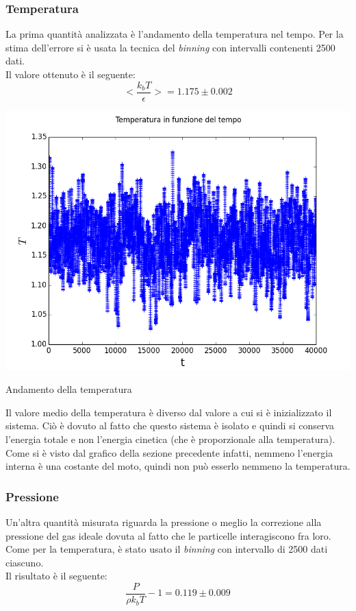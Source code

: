 \subsubsection{Temperatura}
La prima quantità analizzata è l'andamento della temperatura nel tempo. Per la stima dell'errore si è usata la tecnica del \emph{binning} con intervalli contenenti 2500 dati.\\
Il valore ottenuto è il seguente:
$$
		<\frac{k_b T}{\epsilon}> = 1.175 \pm 0.002
$$

\begin{myfig}[h]
\includegraphics[scale=0.55]{soft_core/10_temp.png}
\caption{Andamento della temperatura}
\end{myfig}
Il valore medio della temperatura è diverso dal valore a cui si è inizializzato il sistema. Ciò è dovuto al fatto che questo sistema è isolato e quindi si conserva l'energia totale e non l'energia cinetica (che è proporzionale alla temperatura).
Come si è visto dal grafico della sezione precedente infatti, nemmeno l'energia interna è una costante del moto, quindi non può esserlo nemmeno la temperatura.\\

\subsubsection{Pressione}
Un'altra quantità misurata riguarda la pressione o meglio la correzione alla pressione del gas ideale dovuta al fatto che le particelle interagiscono fra loro.
Come per la temperatura, è stato usato il \emph{binning} con intervallo di 2500 dati ciascuno.\\
Il risultato è il seguente:
$$
	\frac{P}{\rho k_b T} - 1 = 0.119 \pm 0.009
$$ 

